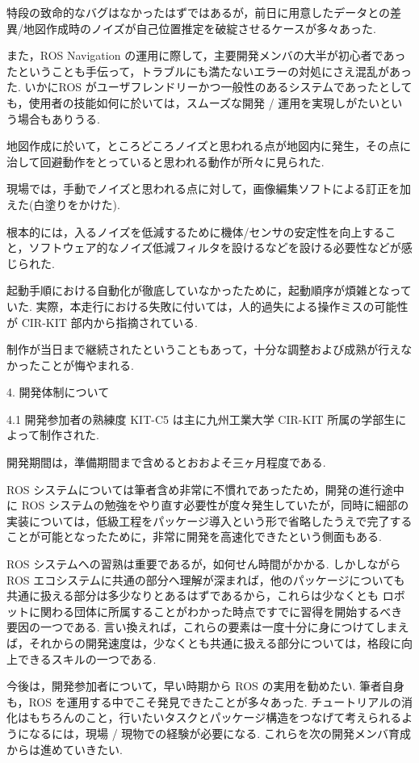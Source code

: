 \documentclass[twocolumn,10pt,a4paper]{jsarticle}
\begin{document}
特段の致命的なバグはなかったはずではあるが，前日に用意したデータとの差異/地図作成時のノイズが自己位置推定を破綻させるケースが多々あった.

また，ROS Navigation の運用に際して，主要開発メンバの大半が初心者であったということも手伝って，トラブルにも満たないエラーの対処にさえ混乱があった. いかにROS がユーザフレンドリーかつ一般性のあるシステムであったとしても，使用者の技能如何に於いては，スムーズな開発 / 運用を実現しがたいという場合もありうる.

地図作成に於いて，ところどころノイズと思われる点が地図内に発生，その点に治して回避動作をとっていると思われる動作が所々に見られた.

現場では，手動でノイズと思われる点に対して，画像編集ソフトによる訂正を加えた(白塗りをかけた).

根本的には，入るノイズを低減するために機体/センサの安定性を向上すること，ソフトウェア的なノイズ低減フィルタを設けるなどを設ける必要性などが感じられた.

起動手順における自動化が徹底していなかったために，起動順序が煩雑となっていた. 実際，本走行における失敗に付いては，人的過失による操作ミスの可能性が CIR-KIT 部内から指摘されている.

制作が当日まで継続されたということもあって，十分な調整および成熟が行えなかったことが悔やまれる.

4. 開発体制について

 4.1 開発参加者の熟練度
KIT-C5 は主に九州工業大学 CIR-KIT 所属の学部生によって制作された.

開発期間は，準備期間まで含めるとおおよそ三ヶ月程度である.

ROS システムについては筆者含め非常に不慣れであったため，開発の進行途中に ROS システムの勉強をやり直す必要性が度々発生していたが，同時に細部の実装については，低級工程をパッケージ導入という形で省略したうえで完了することが可能となったために，非常に開発を高速化できたという側面もある.

ROS システムへの習熟は重要であるが，如何せん時間がかかる. しかしながら ROS エコシステムに共通の部分へ理解が深まれば，他のパッケージについても共通に扱える部分は多少なりとあるはずであるから，これらは少なくとも ロボットに関わる団体に所属することがわかった時点ですでに習得を開始するべき要因の一つである. 言い換えれば，これらの要素は一度十分に身につけてしまえば，それからの開発速度は，少なくとも共通に扱える部分については，格段に向上できるスキルの一つである.

今後は，開発参加者について，早い時期から ROS の実用を勧めたい. 筆者自身も，ROS を運用する中でこそ発見できたことが多々あった.
 チュートリアルの消化はもちろんのこと，行いたいタスクとパッケージ構造をつなげて考えられるようになるには，現場 / 現物での経験が必要になる. これらを次の開発メンバ育成からは進めていきたい.
\end{document}
